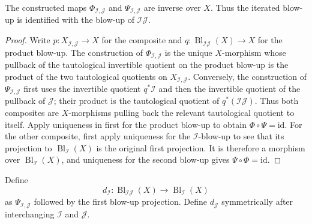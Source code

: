 \begin{theorem}
  \label{thm:nagata-blowup-product-ideal}
  \leanok

  The constructed maps $\Phi_{\mathcal I,\mathcal J}$ and
  $\Psi_{\mathcal I,\mathcal J}$ are inverse over $X$.  Thus the iterated
  blow-up is identified with the blow-up of $\mathcal I\mathcal J$.
\end{theorem}

\begin{proof}
  \leanok
  Write $p\colon X_{\mathcal I,\mathcal J}\to X$ for the composite and
  $q\colon\operatorname{Bl}_{\mathcal I\mathcal J}(X)\to X$ for the
  product blow-up.  The construction of $\Phi_{\mathcal I,\mathcal J}$ is
  the unique $X$-morphism whose pullback of the tautological invertible
  quotient on the product blow-up is the product of the two tautological
  quotients on $X_{\mathcal I,\mathcal J}$.  Conversely, the construction of
  $\Psi_{\mathcal I,\mathcal J}$ first uses the invertible quotient
  $q^*\mathcal I$ and then the invertible quotient of the pullback of
  $\mathcal J$; their product is the tautological quotient of
  $q^*(\mathcal I\mathcal J)$.  Thus both composites are $X$-morphisms
  pulling back the relevant tautological quotient to itself.  Apply uniqueness
  in  first for the product
  blow-up to obtain $\Phi\circ\Psi=\mathrm{id}$.  For the other composite,
  first apply uniqueness for the $\mathcal I$-blow-up to see that its
  projection to $\operatorname{Bl}_{\mathcal I}(X)$ is the original first
  projection.  It is therefore a morphism over
  $\operatorname{Bl}_{\mathcal I}(X)$, and uniqueness for the second blow-up
  gives $\Psi\circ\Phi=\mathrm{id}$.
\end{proof}

\begin{definition}
  \label{def:nagata-blowup-product-domination-maps}
  \leanok

  Define
  \[
    d_{\mathcal I}\colon\operatorname{Bl}_{\mathcal I\mathcal J}(X)
      \longrightarrow\operatorname{Bl}_{\mathcal I}(X)
  \]
  as $\Psi_{\mathcal I,\mathcal J}$ followed by the first blow-up
  projection.  Define $d_{\mathcal J}$ symmetrically after interchanging
  $\mathcal I$ and $\mathcal J$.
\end{definition}

